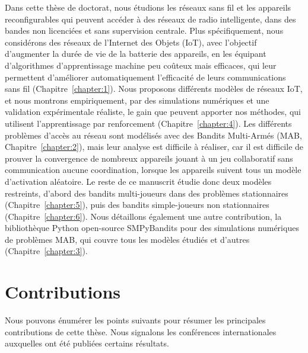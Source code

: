 \begin{resume_fr}



Dans cette thèse de doctorat, nous étudions les réseaux sans fil et les appareils reconfigurables qui peuvent accéder à des réseaux de radio intelligente, dans des bandes non licenciées et sans supervision centrale.
Plus spécifiquement, nous considérons des réseaux de l'Internet des Objets (IoT), avec l'objectif d'augmenter la durée de vie de la batterie des appareils, en les équipant d'algorithmes d'apprentissage machine peu coûteux mais efficaces, qui leur permettent d'améliorer automatiquement l'efficacité de leurs communications sans fil (Chapitre~\ref{chapter:1}).
Nous proposons différents modèles de réseaux IoT, et nous montrons empiriquement, par des simulations numériques et une validation expérimentale réaliste, le gain que peuvent apporter nos méthodes, qui utilisent l'apprentissage par renforcement (Chapitre~\ref{chapter:4}).
Les différents problèmes d'accès au réseau sont modélisés avec des Bandits Multi-Armés (MAB, Chapitre~\ref{chapter:2}), mais leur analyse est difficile à réaliser,
car il est difficile de prouver la convergence de nombreux appareils jouant à un jeu collaboratif sans communication aucune coordination, lorsque les appareils suivent tous un modèle d'activation aléatoire.
Le reste de ce manuscrit étudie donc deux modèles restreints, d'abord des bandits multi-joueurs dans des problèmes stationnaires (Chapitre~\ref{chapter:5}), puis des bandits simple-joueurs non stationnaires (Chapitre~\ref{chapter:6}).
Nous détaillons également une autre contribution, la bibliothèque Python open-source SMPyBandits pour des simulations numériques de problèmes MAB, qui couvre tous les modèles étudiés et d'autres (Chapitre~\ref{chapter:3}).


\section*{Contributions}

Nous pouvons énumérer les points suivants pour résumer les principales contributions de cette thèse.
Nous signalons les conférences internationales auxquelles ont été publiées certains résultats.


\end{resume_fr}
